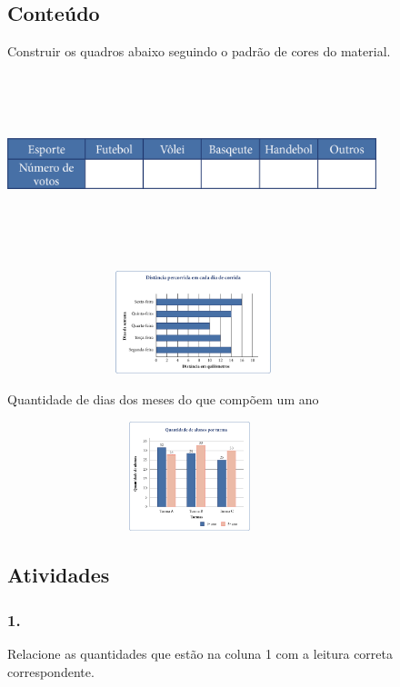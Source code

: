 \subsection{Conteúdo}\label{conteuxfado-3}

Construir os quadros abaixo seguindo o padrão de cores do material.

\includegraphics[width=4.23370in,height=2.06685in]{media/image48.png}

\includegraphics[width=4.25870in,height=1.18344in]{media/image49.png}

Quantidade de dias dos meses do que compõem um ano

\includegraphics[width=4.17946in,height=1.25833in]{media/image50.png}

\subsection{Atividades}\label{atividades-3}

\subsubsection{1.}\label{section-39}

Relacione as quantidades que estão na coluna 1 com a leitura correta
correspondente.

